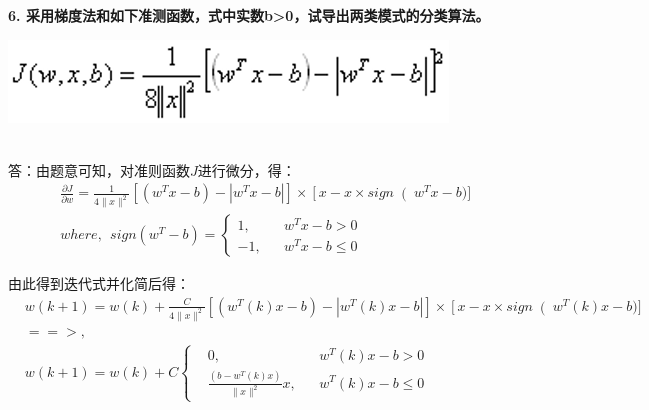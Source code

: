 \documentclass[a4paper, UTF8, 12pt]{ctexart}
\begin{document}
    \textbf{6. 采用梯度法和如下准测函数，式中实数b>0，试导出两类模式的分类算法。} \\
    \centerline{\includegraphics[scale=0.5]{ass6.png}} \\

    答：由题意可知，对准则函数$J$进行微分，得：
    \begin{align*}
        &\frac{\partial{J}}{\partial{w}}=\frac{1}{4\parallel x\parallel^2}\left[
            \left(w^Tx-b\right)-|w^Tx-b|
            \right]\times\left[
            x-x\times sign\right(w^Tx-b)] \\
        &where, \ \ 
        sign(w^T-b)=\left\{
            \begin{aligned}
                1, && w^Tx-b > 0 \\ 
                -1, && w^Tx-b \leq 0
            \end{aligned}
        \right.
    \end{align*}

    由此得到迭代式并化简后得：
    \begin{align*}
        &w(k+1)=w(k)+\frac{C}{4\parallel x\parallel^2}\left[
            \left(w^T(k)x-b\right)-|w^T(k)x-b|
            \right]\times\left[
            x-x\times sign\right(w^T(k)x-b)] \\
        &==>, \\
        &w(k+1)=w(k)+C\left\{
            \begin{aligned}
                &0, && w^T(k)x-b > 0 \\ 
                &\frac{(b-w^T(k)x)}{\parallel x\parallel^2}x, && w^T(k)x-b \leq 0
            \end{aligned}
        \right.
    \end{align*} \\
\end{document}
